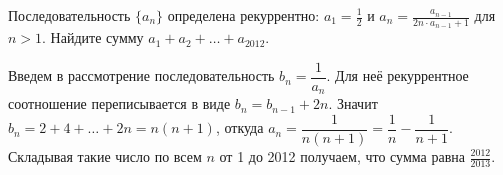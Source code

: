 Последовательность $\{ a_n \}$ определена рекуррентно:
$a_1 = \frac{1}{2}$ и
$a_n = \frac{a_{n - 1}}{2 n \cdot a_{n - 1} + 1}$ для $n > 1$.
Найдите сумму $a_1 + a_2 + \ldots + a_{2012}$.

\solution
Введем в рассмотрение последовательность $b_n = \dfrac{1}{a_n}$.
Для неё рекуррентное соотношение переписывается в виде $b_n = b_{n - 1} + 2 n$.
Значит
$b_n = 2 + 4 + \ldots + 2 n = n (n + 1)$,
откуда
$a_n = \dfrac{1}{n (n + 1)} = \dfrac{1}{n} - \dfrac{1}{n + 1}$.
Складывая такие число по всем $n$ от 1 до 2012 получаем, что сумма равна
$\frac{2012}{2013}$.

